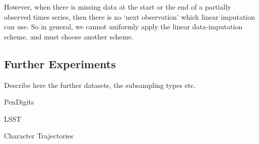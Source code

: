 \documentclass{article}
\begin{document}

However, when there is missing data at the start or the end of a partially observed times series, then there is no `next observation' which linear imputation can use. So in general, we cannot uniformly apply the linear data-imputation scheme, and must choose another scheme.

\subsection{Further Experiments}\label{supp:Experiments}
Describe here the further datasets, the subsampling types etc.

\begin{table}
    \begin{center}
	\caption{PenDigits}
	
	\end{center}
\end{table}

\newpage

\begin{table}
    \begin{center}
	\caption{LSST}
	
	\end{center}
\end{table}

\newpage

\begin{table}
    \begin{center}
	\caption{Character Trajectories }
	
	\end{center}
\end{table}
\end{document}
